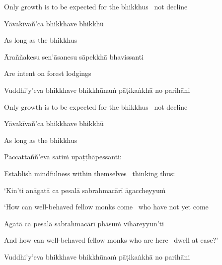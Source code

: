\begin{english-hang}
  Only growth is to be expected for the bhikkhus \breathmark\ not decline
\end{english-hang}

Yāvakīvañ'ca bhikkhave bhikkhū

\begin{english}
  As long as the bhikkhus
\end{english}

Āraññakesu sen'āsanesu sāpekkhā bhavissanti

\begin{english}
  Are intent on forest lodgings
\end{english}

\begin{pali-hang}
Vuddhi'y'eva bhikkhave bhikkhūnaṁ pāṭikaṅkhā no parihāni
\end{pali-hang}

\begin{english-hang}
  Only growth is to be expected for the bhikkhus \breathmark\ not decline
\end{english-hang}

Yāvakīvañ'ca bhikkhave bhikkhū

\begin{english}
  As long as the bhikkhus
\end{english}

Paccattaññ'eva satiṁ upaṭṭhāpessanti:

\begin{english-hang}
  Establish mindfulness within themselves \breathmark\ thinking thus:
\end{english-hang}

`Kin'ti anāgatā ca pesalā sabrahmacārī āgaccheyyuṁ

\begin{english-hang}
  `How can well-behaved fellow monks come \breathmark\ who have not yet come
\end{english-hang}

Āgatā ca pesalā sabrahmacārī phāsuṁ vihareyyun'ti

\begin{english-hang}
  And how can well-behaved fellow monks who are here \breathmark\ dwell at ease?'
\end{english-hang}

\begin{pali-hang}
Vuddhi'y'eva bhikkhave bhikkhūnaṁ pāṭikaṅkhā no parihāni
\end{pali-hang}


